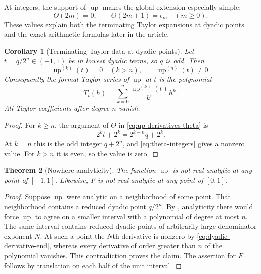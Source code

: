 \documentclass[11pt]{article}
\numberwithin{equation}{section}
\newtheorem{theorem}{Theorem}[section]
\newtheorem{corollary}[theorem]{Corollary}
\theoremstyle{definition}
\theoremstyle{remark}
\newcommand{\upf}{\operatorname{up}}
\newcommand{\Th}{\Theta}
\begin{document}
At integers, the support of $\upf$ makes the global extension especially
simple:
\begin{equation}\label{eq:theta-integers}
 \Th(2m)=0,
 \qquad
 \Th(2m+1)=\epsilon_m
 \quad(m\ge0).
\end{equation}
These values explain both the terminating Taylor expansions at dyadic points
and the exact-arithmetic formulas later in the article.

\begin{corollary}[Terminating Taylor data at dyadic points]
\label{cor:dyadic-taylor}
Let $t=q/2^n\in(-1,1)$ be in lowest dyadic terms, so $q$ is odd.  Then
\begin{equation}\label{eq:dyadic-derivative-end}
 \upf^{(k)}(t)=0\quad(k>n),
 \qquad
 \upf^{(n)}(t)\ne0.
\end{equation}
Consequently the formal Taylor series of $\upf$ at $t$ is the polynomial
\begin{equation}\label{eq:dyadic-taylor-poly}
 T_t(h)=\sum_{k=0}^{n}\frac{\upf^{(k)}(t)}{k!}h^k.
\end{equation}
All Taylor coefficients after degree $n$ vanish.
\end{corollary}

\begin{proof}
For $k\ge n$, the argument of $\Th$ in
\eqref{eq:up-derivatives-theta} is
\[
 2^kt+2^k=2^{k-n}q+2^k.
\]
At $k=n$ this is the odd integer $q+2^n$, and
\eqref{eq:theta-integers} gives a nonzero value.  For $k>n$ it is even, so
the value is zero.
\end{proof}

\begin{theorem}[Nowhere analyticity]\label{thm:nowhere-analytic}
The function $\upf$ is not real-analytic at any point of $[-1,1]$.  Likewise,
$F$ is not real-analytic at any point of $[0,1]$.
\end{theorem}

\begin{proof}
Suppose $\upf$ were analytic on a neighborhood of some point.  That
neighborhood contains a reduced dyadic point $q/2^n$.  By
, analyticity there would force $\upf$ to agree on a
smaller interval with a polynomial of degree at most $n$.  The same interval
contains reduced dyadic points of arbitrarily large denominator exponent
$N$.  At such a point the $N$th derivative is nonzero by
\eqref{eq:dyadic-derivative-end}, whereas every derivative of order greater
than $n$ of the polynomial vanishes.  This contradiction proves the claim.
The assertion for $F$ follows by translation on each half of the unit
interval.
\end{proof}
\end{document}
